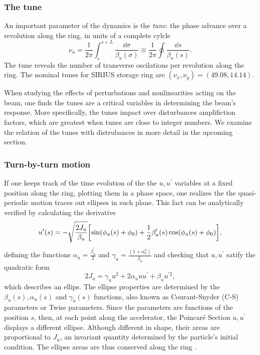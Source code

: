 \subsubsection{The tune}
An important parameter of the dynamics is the \textit{tune}: the phase advance over a revolution along the ring, in units of a complete cylcle
\begin{equation*}
    \nu_u=\frac{1}{2\pi}\int_{s}^{s+L}\frac{\dd \sigma}{\beta_u(\sigma)}\equiv\frac{1}{2\pi}\oint\frac{\dd s}{\beta_u(s)}.
\end{equation*}
The tune reveals the number of transverse oscilations per revolution along the ring. The nominal tunes for SIRIUS storage ring are $(\nu_x, \nu_y)=(49.08, 14.14)$.

When studying the effects of perturbations and nonlinearities acting on the beam, one finds the tunes are a critical variables in determining the beam's response. More specifically, the tunes impact over disturbances amplifiction factors, which are greatest when tunes are close to integer numbers. We examine the relation of the tunes with distrubances in more detail in the upcoming section.

\subsubsection{Turn-by-turn motion}
If one keeps track of the time evolution of the the $u, u^\prime$ variables at a fixed position along the ring, plotting them in a phase space, one realizes the the quasi-periodic motion traces out ellipses in such plane. This fact can be analytically verified by calculating the derivative
    \begin{equation}
        u^{\prime}(s) = - \sqrt{\frac{2J_u}{\beta_u}}\qty[\sin(\phi_u(s) + \phi_0) + \frac{1}{2}\beta_u^\prime(s)\cos(\phi_u(s) + \phi_0)],
        \label{eq:uprime}
    \end{equation}
    defining the functions $\alpha_u = \frac{\beta_u^\prime}{2}$  and $\gamma_u = \frac{(1+\alpha_u^2)}{\beta_u}$ and checking that $u, u^\prime$ satify the quadratic form
    \begin{equation}
        2J_u=\gamma_u u^{2}+2\alpha_u u u^{\prime}+\beta_u u^{\prime2},
     \end{equation}
which describes an ellips. The ellipse properties are determined by the $\beta_u(s), \alpha_u(s)$ and $\gamma_u(s)$ functions, also known as Courant-Snyder (C-S) parameters or Twiss parameters. Since the parameters are functions of the position $s$, then, at each point along the accelerator, the Poincaré Section $u, u^\prime$ displays a different ellipse. Although different in shape, their areas are proportional to $J_u$, an invariant quantity determined by the particle's initial condition. The ellipse areas are thus conserved along the ring \cite{lee_accelerator_2004,wiedemann_particle_2015}.

